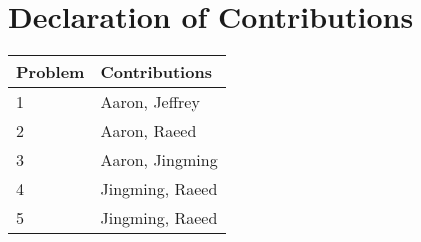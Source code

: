 \section*{Declaration of Contributions}
\begin{table}[htp]
\centering
\begin{tabular}{|l|l|}
\hline
    Problem & Contributions             \\ \hline
    1       & Aaron, Jeffrey            \\ \hline
    2       & Aaron, Raeed              \\ \hline
    3       & Aaron, Jingming           \\ \hline
    4       & Jingming, Raeed           \\ \hline
    5       & Jingming, Raeed           \\ \hline
\end{tabular}
\end{table}